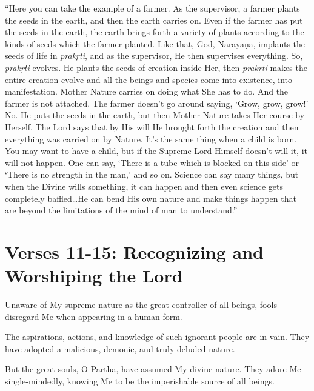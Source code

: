\enquote{Here you can take the example of a farmer. As the supervisor, a farmer plants the seeds in the earth, and then the earth carries on. Even if the farmer has put the seeds in the earth, the earth brings forth a variety of plants according to the kinds of seeds which the farmer planted. Like that, God, Nārāyaṇa, implants the seeds of life in \textit{prakṛti}, and as the supervisor, He then supervises everything. So, \textit{prakṛti} evolves. He plants the seeds of creation inside Her, then \textit{prakṛti} makes the entire creation evolve and all the beings and species come into existence, into manifestation. Mother Nature carries on doing what She has to do. And the farmer is not attached. The farmer doesn’t go around saying, \enquote{Grow, grow, grow!} No. He puts the seeds in the earth, but then Mother Nature takes Her course by Herself. The Lord says that by His will He brought forth the creation and then everything was carried on by Nature. It’s the same thing when a child is born. You may want to have a child, but if the Supreme Lord Himself doesn’t will it, it will not happen. One can say, \enquote{There is a tube which is blocked on this side} or \enquote{There is no strength in the man,} and so on. Science can say many things, but when the Divine wills something, it can happen and then even science gets completely baffled\ldots He can bend His own nature and make things happen that are beyond the limitations of the mind of man to understand.}

\newpage

\section{Verses 11-15: Recognizing and Worshiping the Lord}\label{sec-verses-11-15-recognizing-and-worshiping-the-lord}

{Unaware of My supreme nature as the great controller of all beings, fools disregard Me when appearing in a human form.}

{The aspirations, actions, and knowledge of such ignorant people are in vain. They have adopted a malicious, demonic, and truly deluded nature.}

{But the great souls, O Pārtha, have assumed My divine nature. They adore Me single-mindedly, knowing Me to be the imperishable source of all beings.}

